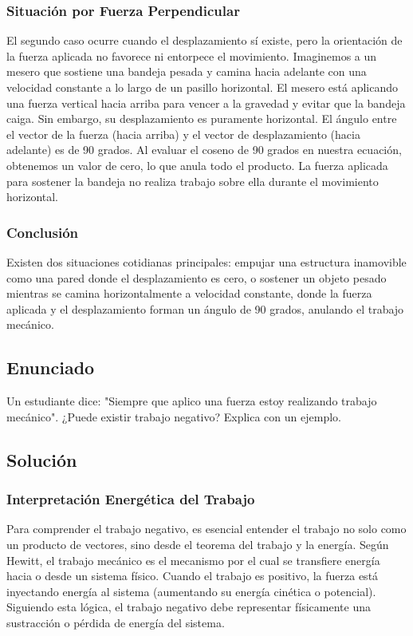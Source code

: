 \documentclass[a4paper,12pt]{article}
\begin{document}
\subsubsection*{Situación por Fuerza Perpendicular}
El segundo caso ocurre cuando el desplazamiento sí existe, pero la orientación de la fuerza aplicada no favorece ni entorpece el movimiento. Imaginemos a un mesero que sostiene una bandeja pesada y camina hacia adelante con una velocidad constante a lo largo de un pasillo horizontal. El mesero está aplicando una fuerza vertical hacia arriba para vencer a la gravedad y evitar que la bandeja caiga. Sin embargo, su desplazamiento es puramente horizontal. El ángulo entre el vector de la fuerza (hacia arriba) y el vector de desplazamiento (hacia adelante) es de 90 grados.
Al evaluar el coseno de 90 grados en nuestra ecuación, obtenemos un valor de cero, lo que anula todo el producto. La fuerza aplicada para sostener la bandeja no realiza trabajo sobre ella durante el movimiento horizontal.

\subsubsection*{Conclusión}
Existen dos situaciones cotidianas principales: empujar una estructura inamovible como una pared donde el desplazamiento es cero, o sostener un objeto pesado mientras se camina horizontalmente a velocidad constante, donde la fuerza aplicada y el desplazamiento forman un ángulo de 90 grados, anulando el trabajo mecánico.

\newpage
\subsection*{Enunciado}
Un estudiante dice: "Siempre que aplico una fuerza estoy realizando trabajo mecánico". 
¿Puede existir trabajo negativo? Explica con un ejemplo.

\subsection*{Solución}

\subsubsection*{Interpretación Energética del Trabajo}
Para comprender el trabajo negativo, es esencial entender el trabajo no solo como un producto de vectores, sino desde el teorema del trabajo y la energía. Según Hewitt, el trabajo mecánico es el mecanismo por el cual se transfiere energía hacia o desde un sistema físico. Cuando el trabajo es positivo, la fuerza está inyectando energía al sistema (aumentando su energía cinética o potencial). Siguiendo esta lógica, el trabajo negativo debe representar físicamente una sustracción o pérdida de energía del sistema. 
\end{document}
